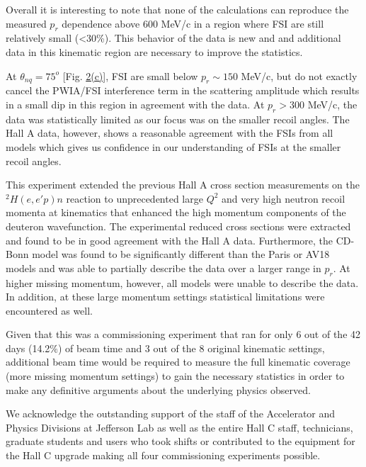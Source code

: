 Overall it is interesting to note that none of the calculations can reproduce the measured $p_r$ dependence above 600 MeV/c in a region where FSI are still relatively small (<30\%).  This behavior of the data is new and 
and additional data in this kinematic region are necessary to improve the statistics.

At $\theta_{nq}=75^{o}$ [Fig. \hyperref[fig:fig2]{2(c)}], FSI are small below $p_{r}\sim150$ MeV/c, but do not exactly cancel the PWIA/FSI interference term in the scattering amplitude which results in a small dip in this region in agreement with the data.
At $p_{r}>300$ MeV/c, the data was statistically limited as our focus was on the smaller recoil angles. The Hall A data, however, shows a reasonable agreement with the FSIs from all models which gives us confidence in our understanding
of FSIs at the smaller recoil angles. 

This experiment extended the previous Hall A cross section measurements on the $^{2}H(e,e'p)n$ reaction to 
unprecedented large $Q^{2}$ and very high neutron recoil momenta at kinematics that enhanced the high momentum components of the deuteron wavefunction.
The experimental reduced cross sections were extracted and found to be in good agreement with the Hall A data. Furthermore, the CD-Bonn model was found to be
significantly different than the Paris or AV18 models and was able to partially describe the data over a larger range in $p_{r}$.
At higher missing momentum, however, all models were unable to describe the data. In addition, at these large momentum settings statistical limitations were encountered as well.

Given that this was a commissioning experiment that ran for only 6 out of the 42 days (14.2$\%$) of beam time and 3 out of the 8 original kinematic settings,
additional beam time would be required to measure the full kinematic coverage (more missing momentum settings) to gain the necessary statistics 
in order to make any definitive arguments about the underlying physics observed.

We acknowledge the outstanding support of the staff of the Accelerator and Physics Divisions at Jefferson Lab
as well as the entire Hall C staff, technicians, graduate students and users who took shifts or contributed
to the equipment for the Hall C upgrade making all four commissioning experiments possible. 

